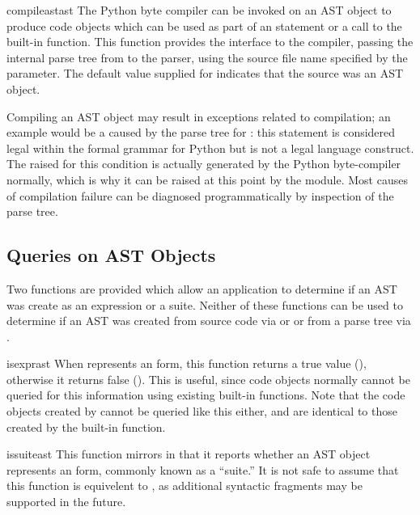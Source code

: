 \begin{funcdesc}{compileast}{ast}
The Python byte compiler can be invoked on an AST object to produce
code objects which can be used as part of an  statement or
a call to the built-in  function.  This function provides
the interface to the compiler, passing the internal parse tree from
 to the parser, using the source file name specified
by the  parameter.  The default value supplied
for  indicates that the source was an AST object.

Compiling an AST object may result in exceptions related to
compilation; an example would be a  caused by the
parse tree for : this statement is considered legal
within the formal grammar for Python but is not a legal language
construct.  The  raised for this condition is
actually generated by the Python byte-compiler normally, which is why
it can be raised at this point by the  module.  Most
causes of compilation failure can be diagnosed programmatically by
inspection of the parse tree.
\end{funcdesc}


\subsection{Queries on AST Objects}

Two functions are provided which allow an application to determine if
an AST was create as an expression or a suite.  Neither of these
functions can be used to determine if an AST was created from source
code via  or  or from a parse tree via
.

\begin{funcdesc}{isexpr}{ast}
When  represents an  form, this function
returns a true value (), otherwise it returns false
().  This is useful, since code objects normally cannot be
queried for this information using existing built-in functions.  Note
that the code objects created by  cannot be queried
like this either, and are identical to those created by the built-in
 function.
\end{funcdesc}


\begin{funcdesc}{issuite}{ast}
This function mirrors  in that it reports whether an
AST object represents an  form, commonly known as a
``suite.''  It is not safe to assume that this function is equivelent
to , as additional syntactic fragments may
be supported in the future.
\end{funcdesc}


